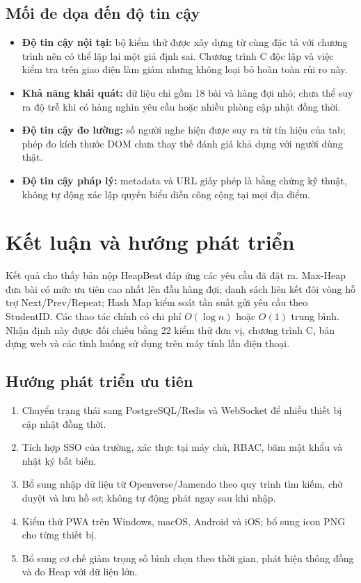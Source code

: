 \documentclass[12pt,a4paper,twoside,openright]{report}
\begin{document}
\section{Mối đe dọa đến độ tin cậy}
\begin{itemize}
  \item \textbf{Độ tin cậy nội tại:} bộ kiểm thử được xây dựng từ cùng đặc tả với chương
  trình nên có thể lặp lại một giả định sai. Chương trình C độc lập và việc kiểm tra trên
  giao diện làm giảm nhưng không loại bỏ hoàn toàn rủi ro này.
  \item \textbf{Khả năng khái quát:} dữ liệu chỉ gồm 18 bài và hàng đợi nhỏ; chưa thể suy ra
  độ trễ khi có hàng nghìn yêu cầu hoặc nhiều phòng cập nhật đồng thời.
  \item \textbf{Độ tin cậy đo lường:} số người nghe hiện được suy ra từ tín hiệu của tab;
  phép đo kích thước DOM chưa thay thế đánh giá khả dụng với người dùng thật.
  \item \textbf{Độ tin cậy pháp lý:} metadata và URL giấy phép là bằng chứng kỹ thuật,
  không tự động xác lập quyền biểu diễn công cộng tại mọi địa điểm.
\end{itemize}

\clearpage
\chapter{Kết luận và hướng phát triển}
Kết quả cho thấy bản nộp HeapBeat đáp ứng các yêu cầu đã đặt ra. Max-Heap đưa bài có mức ưu
tiên cao nhất lên đầu hàng đợi; danh sách liên kết đôi vòng hỗ trợ Next/Prev/Repeat; Hash
Map kiểm soát tần suất gửi yêu cầu theo StudentID. Các thao tác chính có chi phí
$O(\log n)$ hoặc $O(1)$ trung bình. Nhận định này được đối chiếu bằng 22 kiểm thử đơn vị,
chương trình C, bản dựng web và các tình huống sử dụng trên máy tính lẫn điện thoại.

\section{Hướng phát triển ưu tiên}
\begin{enumerate}
  \item Chuyển trạng thái sang PostgreSQL/Redis và WebSocket để nhiều thiết bị cập nhật đồng thời.
  \item Tích hợp SSO của trường, xác thực tại máy chủ, RBAC, băm mật khẩu và nhật ký bất biến.
  \item Bổ sung nhập dữ liệu từ Openverse/Jamendo theo quy trình tìm kiếm, chờ duyệt và lưu
  hồ sơ; không tự động phát ngay sau khi nhập.
  \item Kiểm thử PWA trên Windows, macOS, Android và iOS; bổ sung icon PNG cho từng thiết bị.
  \item Bổ sung cơ chế giảm trọng số bình chọn theo thời gian, phát hiện thông đồng và đo Heap với dữ liệu lớn.
\end{enumerate}
\end{document}
